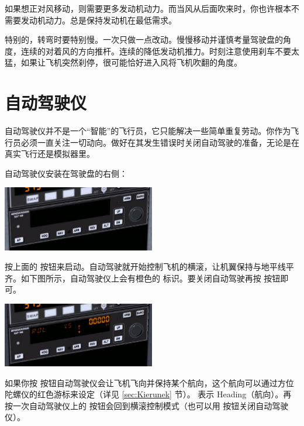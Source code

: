 如果想正对风移动，则需要更多发动机动力。而当风从后面吹来时，你也许根本不需要发动机动力。总是保持发动机在最低需求。

特别的，转弯时要特别慢。一次只做一点改动。慢慢移动并谨慎考量驾驶盘的角度，连续的对着风的方向推杆。连续的降低发动机推力。时刻注意使用刹车不要太猛，如果让飞机突然刹停，很可能恰好进入风将飞机吹翻的角度。

\section{自动驾驶仪}
\label{sec:Autopilot}

自动驾驶仪并不是一个“智能”的飞行员，它只能解决一些简单重复劳动。你作为飞行员必须一直关注一切动向。做好在其发生错误时关闭自动驾驶的准备，无论是在真实飞行还是模拟器里。

自动驾驶仪安装在驾驶盘的右侧：

\begin{center}
\includegraphics[width=0.5\textwidth]{img/tut_49}
\end{center}

按上面的  按钮来启动。自动驾驶就开始控制飞机的横滚，让机翼保持与地平线平齐。如下图所示，自动驾驶仪上会有橙色的 \textcolor{orange}{} 标识。要关闭自动驾驶再按  按钮即可。

\begin{center}
\includegraphics[width=0.5\textwidth]{img/tut_50}
\end{center}

如果你按  按钮自动驾驶仪会让飞机飞向并保持某个航向，这个航向可以通过方位陀螺仪的红色游标来设定（详见 \ref{sec:Kierunek} 节）。\textcolor{orange}{} 表示 Heading（航向）。再按一次自动驾驶仪上的  按钮会回到横滚控制模式（也可以用  按钮关闭自动驾驶仪）。

